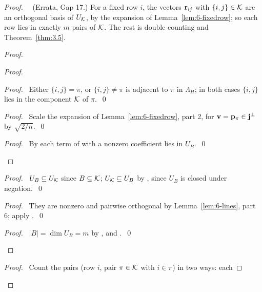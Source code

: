 \begin{proof}
 \pfsketch\ \repair\ (Errata, Gap 17.) For a fixed row $i$, the vectors ${\mathbf r}_{ij}$ with
 $\{i,j\}\in{\mathcal K}$ are an orthogonal basis of $U_{\mathcal K}$, by the expansion of
 Lemma~\ref{lem:6-fixedrow}; so each row lies in exactly $m$ pairs of ${\mathcal K}$. The rest is double
 counting and Theorem~\ref{thm:3.5}.
 \begin{proof}
  \begin{proof}
   \begin{proof}\pf\ Either $\{i,j\}=\pi$, or $\{i,j\}\neq\pi$ is adjacent to $\pi$ in
    $\Lambda_H$; in both cases $\{i,j\}$ lies in the component ${\mathcal K}$ of $\pi$.~\qed\end{proof}
   \begin{proof}\pf\ Scale the expansion of Lemma~\ref{lem:6-fixedrow}, part 2, for
    ${\mathbf v}={\mathbf p}_\pi\in{\mathbf j}^\perp$ by $\sqrt{2/n}$.~\qed\end{proof}
   \qedstep
   \begin{proof}\pf\ By  each term of  with a nonzero
    coefficient lies in $U_B$.~\qed\end{proof}
  \end{proof}
  \begin{proof}\pf\ $U_B\subseteq U_{\mathcal K}$ since $B\subseteq{\mathcal K}$; $U_{\mathcal K}\subseteq U_B$ by ,
   since $U_B$ is closed under negation.~\qed\end{proof}
  \begin{proof}\pf\ They are nonzero and pairwise orthogonal by Lemma~\ref{lem:6-lines}, part 6;
   apply .~\qed\end{proof}
  \qedstep
  \begin{proof}\pf\ $|B|=\dim U_B=m$ by ,  and
   .~\qed\end{proof}
 \end{proof}
 \begin{proof}\pf\ Count the pairs (row $i$, pair $\pi\in{\mathcal K}$ with $i\in\pi$) in two ways: each

\end{proof}
\end{proof}
